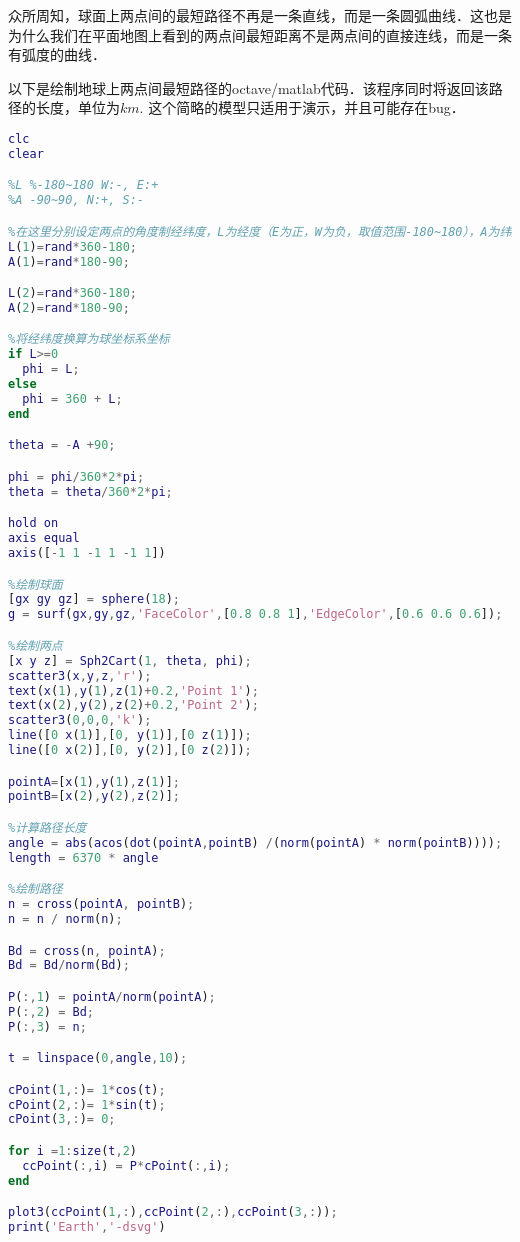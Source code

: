 
众所周知，球面上两点间的最短路径不再是一条直线，而是一条圆弧曲线．这也是为什么我们在平面地图上看到的两点间最短距离不是两点间的直接连线，而是一条有弧度的曲线．

以下是绘制地球上两点间最短路径的octave/matlab代码．该程序同时将返回该路径的长度，单位为$km$. 这个简略的模型只适用于演示，并且可能存在bug．%

\begin{lstlisting}[language=matlab]
clc
clear

%L %-180~180 W:-, E:+
%A -90~90, N:+, S:-

%在这里分别设定两点的角度制经纬度，L为经度（E为正，W为负，取值范围-180~180），A为纬度（N为正，S为负，取值范围-90~90）．
L(1)=rand*360-180;
A(1)=rand*180-90;

L(2)=rand*360-180;
A(2)=rand*180-90;

%将经纬度换算为球坐标系坐标
if L>=0
  phi = L;
else
  phi = 360 + L;
end

theta = -A +90;

phi = phi/360*2*pi;
theta = theta/360*2*pi;

hold on
axis equal
axis([-1 1 -1 1 -1 1])

%绘制球面
[gx gy gz] = sphere(18);
g = surf(gx,gy,gz,'FaceColor',[0.8 0.8 1],'EdgeColor',[0.6 0.6 0.6]);

%绘制两点
[x y z] = Sph2Cart(1, theta, phi);
scatter3(x,y,z,'r');
text(x(1),y(1),z(1)+0.2,'Point 1');
text(x(2),y(2),z(2)+0.2,'Point 2');
scatter3(0,0,0,'k');
line([0 x(1)],[0, y(1)],[0 z(1)]);
line([0 x(2)],[0, y(2)],[0 z(2)]);

pointA=[x(1),y(1),z(1)];
pointB=[x(2),y(2),z(2)];

%计算路径长度
angle = abs(acos(dot(pointA,pointB) /(norm(pointA) * norm(pointB))));
length = 6370 * angle

%绘制路径
n = cross(pointA, pointB);
n = n / norm(n);

Bd = cross(n, pointA);
Bd = Bd/norm(Bd);

P(:,1) = pointA/norm(pointA);
P(:,2) = Bd;
P(:,3) = n;

t = linspace(0,angle,10);

cPoint(1,:)= 1*cos(t);
cPoint(2,:)= 1*sin(t);
cPoint(3,:)= 0;

for i =1:size(t,2)
  ccPoint(:,i) = P*cPoint(:,i);
end

plot3(ccPoint(1,:),ccPoint(2,:),ccPoint(3,:));
print('Earth','-dsvg')

\end{lstlisting}
